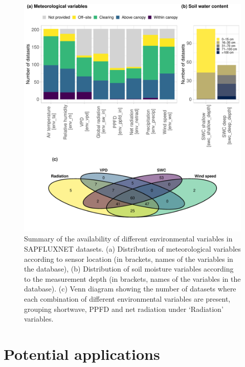 \documentclass[11pt,twoside]{reedthesis}
\begin{document}
\setlength{\abovecaptionskip}{0pt}
\begin{figure}[hbt!]

{\centering \includegraphics[width=1\linewidth]{figure/CH3/Figure8} 

}

\caption[Summary of the availability of different environmental variables in SAPFLUXNET datasets.]{Summary of the availability of different environmental variables in SAPFLUXNET datasets. (a) Distribution of meteorological variables according to sensor location (in brackets, names of the variables in the database), (b) Distribution of soil moisture variables according to the measurement depth (in brackets, names of the variables in the database). (c) Venn diagram showing the number of datasets where each combination of different environmental variables are present, grouping shortwave, PPFD and net radiation under ‘Radiation’ variables.}\label{fig:Ch2plot8}
\end{figure}
\vspace*{\fill} \newpage

\section{Potential applications}\label{potential-applications}
\end{document}
